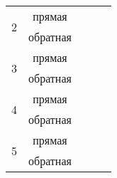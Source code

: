 \begin{table}[h]
\begin{tabular}{|c|c|c|c|c|}
\multirow{2}{*}{2}                                                    & прямая     &                                                                     &                                                                      &                                                                       \\ \cline{2-5} 
                                                                      & обратная   &                                                                     &                                                                      &                                                                       \\ \hline
\multirow{2}{*}{3}                                                    & прямая     &                                                                     &                                                                      &                                                                       \\ \cline{2-5} 
                                                                      & обратная   &                                                                     &                                                                      &                                                                       \\ \hline
\multirow{2}{*}{4}                                                    & прямая     &                                                                     &                                                                      &                                                                       \\ \cline{2-5} 
                                                                      & обратная   &                                                                     &                                                                      &                                                                       \\ \hline
\multirow{2}{*}{5}                                                    & прямая     & \multicolumn{1}{l|}{}                                               & \multicolumn{1}{l|}{}                                                & \multicolumn{1}{l|}{}                                                 \\ \cline{2-5} 
                                                                      & обратная   & \multicolumn{1}{l|}{}                                               & \multicolumn{1}{l|}{}                                                & \multicolumn{1}{l|}{}                                                 \\ \hline
\end{tabular}
\end{table}

